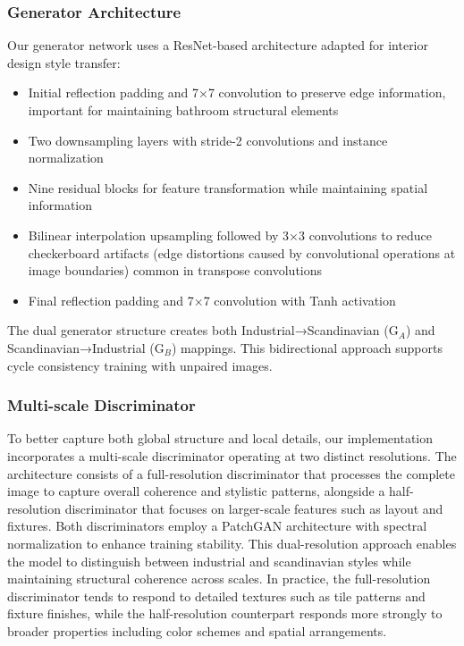 \documentclass[twocolumn,superscriptaddress,aps]{revtex4-1}
\begin{document}
\subsubsection{Generator Architecture}

Our generator network uses a ResNet-based architecture adapted for interior design style transfer:

\begin{itemize}
    \item Initial reflection padding and 7×7 convolution to preserve edge information, important for maintaining bathroom structural elements
    \item Two downsampling layers with stride-2 convolutions and instance normalization
    \item Nine residual blocks for feature transformation while maintaining spatial information
    \item Bilinear interpolation upsampling followed by 3×3 convolutions to reduce checkerboard artifacts (edge distortions caused by convolutional operations at image boundaries) common in transpose convolutions
    \item Final reflection padding and 7×7 convolution with Tanh activation
\end{itemize}

The dual generator structure creates both Industrial→Scandinavian (G$_A$) and Scandinavian→Industrial (G$_B$) mappings. This bidirectional approach supports cycle consistency training with unpaired images.

\subsubsection{Multi-scale Discriminator}

To better capture both global structure and local details, our implementation incorporates a multi-scale discriminator operating at two distinct resolutions. The architecture consists of a full-resolution discriminator that processes the complete image to capture overall coherence and stylistic patterns, alongside a half-resolution discriminator that focuses on larger-scale features such as layout and fixtures. Both discriminators employ a PatchGAN architecture with spectral normalization \cite{miyato2018spectral} to enhance training stability. This dual-resolution approach enables the model to distinguish between industrial and scandinavian styles while maintaining structural coherence across scales. In practice, the full-resolution discriminator tends to respond to detailed textures such as tile patterns and fixture finishes, while the half-resolution counterpart responds more strongly to broader properties including color schemes and spatial arrangements.
\end{document}
